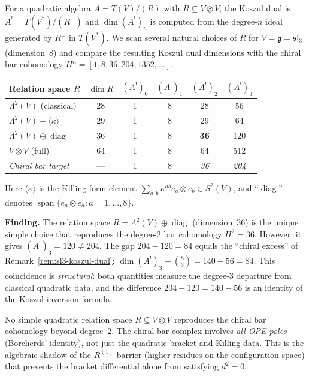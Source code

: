 \begin{computation}
\label{comp:sl3-koszul-dual-scan}

For a quadratic algebra $A = T(V)/(R)$ with $R \subseteq V \otimes V$,
the Koszul dual is $A^! = T(V^*) / (R^\perp)$ and $\dim(A^!)_n$
is computed from the degree-$n$ ideal generated by $R^\perp$ in
$T(V^*)$.  We scan several natural choices of $R$ for
$V = \mathfrak{g} = \mathfrak{sl}_3$ (dimension~$8$) and compare
the resulting Koszul dual dimensions with the chiral bar cohomology
$H^n = [1, 8, 36, 204, 1352, \ldots]$.

\medskip
\noindent
\begin{center}
\begin{tabular}{l|c|cccc}
Relation space $R$ & $\dim R$ & $(A^!)_0$ & $(A^!)_1$ & $(A^!)_2$ & $(A^!)_3$ \\
\hline
$\Lambda^2(V)$ (classical) & 28 & 1 & 8 & 28 & 56 \\
$\Lambda^2(V) + \langle \kappa \rangle$ & 29 & 1 & 8 & 29 & 64 \\
$\Lambda^2(V) \oplus \operatorname{diag}$ & 36 & 1 & 8 & \textbf{36} & 120 \\
$V \otimes V$ (full) & 64 & 1 & 8 & 64 & 512 \\
\hline
\textit{Chiral bar target} & --- & 1 & 8 & \textit{36} & \textit{204}
\end{tabular}
\end{center}

Here $\langle \kappa \rangle$ is the Killing form element
$\sum_{a,b} \kappa^{ab} e_a \otimes e_b \in S^2(V)$, and
``$\operatorname{diag}$'' denotes $\operatorname{span}\{e_a \otimes e_a
: a = 1, \ldots, 8\}$.

\medskip
\noindent\textbf{Finding.}
The relation space $R = \Lambda^2(V) \oplus \operatorname{diag}$ (dimension~$36$)
is the unique simple choice that reproduces the degree-$2$ bar
cohomology $H^2 = 36$.  However, it gives $(A^!)_3 = 120 \neq 204$.
The gap $204 - 120 = 84$ equals the ``chiral excess'' of
Remark~\ref{rem:sl3-koszul-dual}: $\dim(A^!)_3 - \binom{8}{3} = 140 - 56 = 84$.
This coincidence is \emph{structural}: both quantities measure the
degree-$3$ departure from classical quadratic data, and the difference
$204 - 120 = 140 - 56$ is an identity of the Koszul inversion formula.

No simple quadratic relation space $R \subseteq V \otimes V$ reproduces
the chiral bar cohomology beyond degree~$2$.  The chiral bar complex
involves \emph{all OPE poles} (Borcherds' identity), not just the
quadratic bracket-and-Killing data.  This is the algebraic shadow
of the $R^{(1)}$ barrier (higher residues on the configuration space)
that prevents the bracket differential alone from satisfying $d^2 = 0$.


\end{computation}

